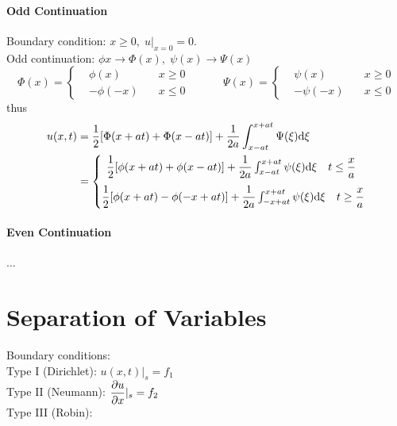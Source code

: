 \documentclass[UTF8]{ctexart} %
\DeclareMathOperator{\ra}{\rightarrow}
\newcommand{\dis}{\displaystyle}
\numberwithin{equation}{section}
\begin{document}
\paragraph{Odd Continuation}
Boundary condition: $x\geq 0,\; u|_{x=0} = 0$.\\
Odd continuation: $\phi{x} \ra \Phi(x),\; \psi(x) \ra \Psi(x)$
\begin{equation}\label{key}
\Phi(x) = \left\{\begin{aligned}
&\phi(x) \quad & x\geq 0\\
&-\phi(-x)\quad &x\leq 0
\end{aligned}\right.
\qquad\quad
\Psi(x) = \left\{\begin{aligned}
&\psi(x) \quad & x\geq 0\\
&-\psi(-x)\quad &x\leq 0
\end{aligned}\right.
\end{equation}
thus
\begin{equation}\label{key}
\begin{aligned}
u(x,t) &=\dfrac{1}{2}[\Phi(x+at) + \Phi(x-at)] + \dfrac{1}{2a}\int_{x-at}^{x+at} \Psi(\xi)\dd\xi\\
&=\left\{\mqty{\dfrac{1}{2}[\phi(x+at) + \phi(x-at)] + \dfrac{1}{2a}\int_{x-at}^{x+at} \psi(\xi)\dd\xi \quad t\leq\dfrac{x}{a}~\vspace{7pt}\\
\dfrac{1}{2}[\phi(x+at) - \phi(-x+at)] + \dfrac{1}{2a}\int_{-x+at}^{x+at} \psi(\xi)\dd\xi \quad t\geq\dfrac{x}{a}}
\right.
\end{aligned}
\end{equation}
\paragraph{Even Continuation}
...\\

\section{Separation of Variables}
Boundary conditions:\\
Type I (Dirichlet): $u(x,t)|_s = f_1$\\
Type II (Neumann): $\dis\pdv{u}{x}\rvert_s = f_2$\\
Type III (Robin): $~$
\end{document}
